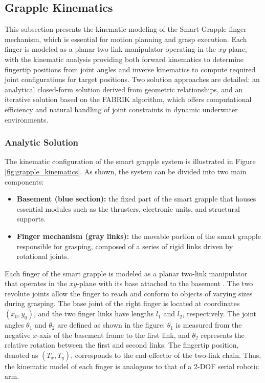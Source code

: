 \documentclass[a4paper,11pt]{article}
\begin{document}
\subsection{Grapple Kinematics}

This subsection presents the kinematic modeling of the Smart Grapple finger mechanism, which is essential for motion planning and grasp execution. Each finger is modeled as a planar two-link manipulator operating in the $xy$-plane, with the kinematic analysis providing both forward kinematics to determine fingertip positions from joint angles and inverse kinematics to compute required joint configurations for target positions. Two solution approaches are detailed: an analytical closed-form solution derived from geometric relationships, and an iterative solution based on the \gls{FABRIK} algorithm, which offers computational efficiency and natural handling of joint constraints in dynamic underwater environments.


\subsubsection{Analytic Solution} \label{sec:IK_ana}
The kinematic configuration of the smart grapple system is illustrated in Figure \ref{fig:grapple_kinematics}. As shown, the system can be divided into two main components:
\begin{itemize}
    \item \textbf{Basement (blue section):} the fixed part of the smart grapple that houses essential modules such as the thrusters, electronic units, and structural supports.
    \item \textbf{Finger mechanism (gray links):} the movable portion of the smart grapple responsible for grasping, composed of a series of rigid links driven by rotational joints.
\end{itemize}
Each finger of the smart grapple is modeled as a planar two-link manipulator that operates in the $xy$-plane with its base attached to the basement . The two revolute joints allow the finger to reach and conform to objects of varying sizes during grasping. The base joint of the right finger is located at coordinates $(x_0, y_0)$, and the two finger links have lengths $l_1$ and $l_2$, respectively. The joint angles $\theta_1$ and $\theta_2$ are defined as shown in the figure: $\theta_1$ is measured from the negative $x$-axis of the basement frame to the first link, and $\theta_2$ represents the relative rotation between the first and second links. The fingertip position, denoted as $(T_x, T_y)$, corresponds to the end-effector of the two-link chain. Thus, the kinematic model of each finger is analogous to that of a 2-DOF serial robotic arm.
\end{document}
